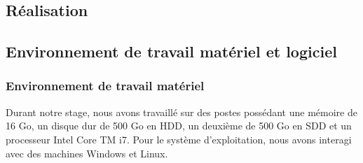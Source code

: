 \begin{spacing}{1.2}
\section{Réalisation}
\subsection{Environnement de travail matériel et logiciel}
\subsubsection{Environnement de travail matériel}
Durant notre stage, nous avons travaillé sur des postes possédant une mémoire de 16 Go, un disque dur de 500 Go en HDD, un deuxième de 500 Go en SDD et un processeur Intel Core TM i7. Pour le système d’exploitation, nous avons interagi avec des machines Windows et Linux.

\end{spacing}
